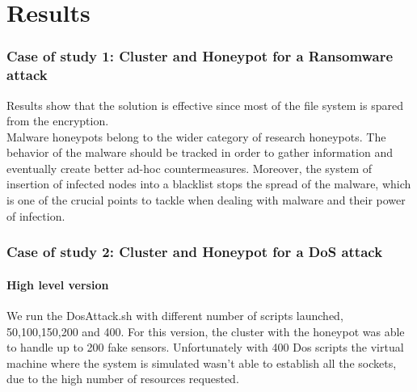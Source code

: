 \chapter{Results}

\subsection{Case of study 1: Cluster and Honeypot for a Ransomware attack}

Results show that the solution is effective since most of the file system is spared from the encryption. \\
Malware honeypots belong to the wider category of research honeypots. The behavior of the malware should be tracked in order to gather information and eventually create better ad-hoc countermeasures. Moreover, the system of insertion of infected nodes into a blacklist stops the spread of the malware, which is one of the crucial points to tackle when dealing with malware and their power of infection.


\subsection{Case of study 2: Cluster and Honeypot for a DoS attack}

\subsubsection{High level version}
We run the DosAttack.sh with different number of scripts launched, 50,100,150,200 and 400. For this version, the cluster with the honeypot was able to handle up to 200 fake sensors. 
Unfortunately with 400 Dos scripts the virtual machine where the system is simulated wasn't able to establish all the sockets, due to the high number of resources requested.

